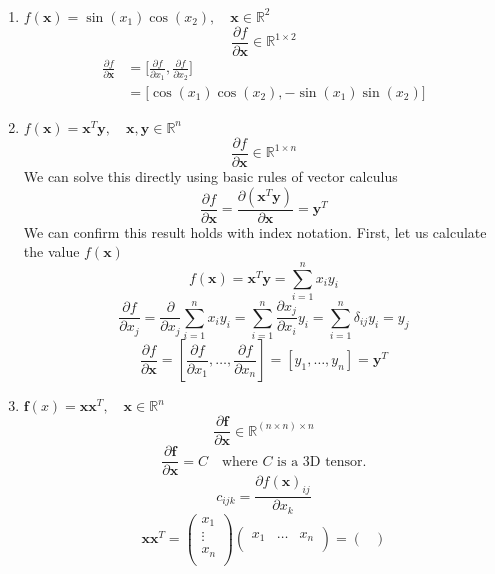 \paragraph{}

\begin{enumerate}[label=\alph*]
    \item $f(\textbf{x}) = \sin(x_1)\cos(x_2), \quad \textbf{x}\in \mathbb{R}^2$
\[
\frac{\partial f}{\partial\textbf{x}} \in \mathbb{R}^{1\times 2}
\]
\begin{align*}
\frac{\partial f}{\partial\textbf{x}} &= \bigg[\frac{\partial f}{\partial x_1}, \frac{\partial f}{\partial x_2} \bigg]\\
&=\bigg[\cos(x_1)\cos(x_2), -\sin(x_1)\sin(x_2) \bigg]
\end{align*}
\item $f(\textbf{x}) = \textbf{x}^T\textbf{y}, \quad \textbf{x},\textbf{y}\in \mathbb{R}^n$
\[
\frac{\partial f}{\partial\textbf{x}} \in \mathbb{R}^{1\times n}
\]
We can solve this directly using basic rules of vector calculus
\[
\frac{\partial f}{\partial\textbf{x}} = \frac{\partial (\textbf{x}^T\textbf{y})}{\partial \textbf{x}} = \textbf{y}^T
\]
We can confirm this result holds with index notation. First, let us calculate the value $f(\textbf{x})$
\[
f(\textbf{x}) = \textbf{x}^T\textbf{y} = \sum_{i=1}^n x_iy_i
\]
\[
\frac{\partial f}{\partial x_j} = \frac{\partial}{\partial x_j}\sum_{i=1}^n x_iy_i =  \sum_{i=1}^n \frac{\partial x_j}{\partial x_i}y_i = \sum_{i=1}^n \delta_{ij}y_i = y_j
\]
\[
\frac{\partial f}{\partial\textbf{x}} = \left[\frac{\partial f}{\partial x_1}, \dots, \frac{\partial f}{\partial x_n}\right] = \left[y_1, \dots, y_n\right] = \textbf{y}^T
\]
\item $\textbf{f}(x) = \textbf{x}\textbf{x}^T, \quad \textbf{x}\in \mathbb{R}^n$
\[
\frac{\partial \textbf{f}}{\partial\textbf{x}} \in \mathbb{R}^{(n\times n)\times n}
\]
\[
\frac{\partial \textbf{f}}{\partial\textbf{x}}= C\quad \text{where $C$ is a 3D tensor.}
\]
\[
c_{ijk} = \frac{\partial f(\textbf{x})_{ij}}{\partial x_k}
\]
\[
\textbf{x}\textbf{x}^T = \begin{pmatrix}
    x_1   \\
    \vdots \\
    x_n \\
\end{pmatrix}
\begin{pmatrix}
    x_1 & \dots & x_n \\
\end{pmatrix} = \begin{pmatrix}

\end{pmatrix}\]
\end{enumerate}
